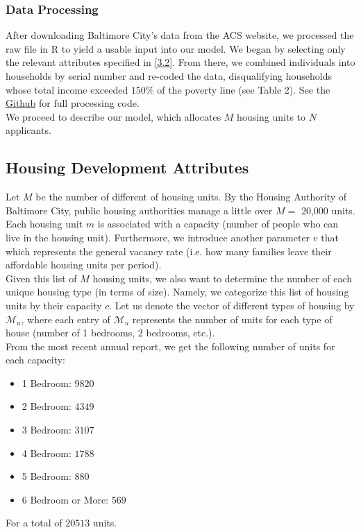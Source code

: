 \documentclass[11pt]{article}
\begin{document}
\subsubsection{Data Processing}
After downloading Baltimore City's data from the ACS website, we processed the raw file in R to yield a usable input into our model. We began by selecting only the relevant attributes specified in \autoref{3.2}. From there, we combined individuals into households by serial number and re-coded the data, disqualifying households whose total income exceeded $150\%$ of the poverty line (see Table 2). See the \href{https://github.com/atulpokh/cpsc464final/tree/main}{Github}  for full processing code. \\
\newline
We proceed to describe our model, which allocates $M$ housing units to $N$ applicants. 
\subsection{Housing Development Attributes}
Let $M$ be the number of different of housing units. By the Housing Authority of Baltimore City, public housing authorities manage a little over $M = $ 20,000 units. Each housing unit $m$ is associated with a capacity (number of people who can live in the housing unit). Furthermore, we introduce another parameter $v$ that which represents the general vacancy rate (i.e. how many families leave their affordable housing units per period). \\
\newline
Given this list of $M$ housing units, we also want to determine the number of each unique housing type (in terms of size). Namely, we categorize this list of housing units by their capacity $c$. Let us denote the vector of different types of housing by $\mathcal{M}_u$, where each entry of $\mathcal{M}_u$ represents the number of units for each type of house (number of 1 bedrooms, 2 bedrooms, etc.). \\
\newline
From the most recent annual report, we get the following number of units for each capacity:
\begin{itemize}
    \item 1 Bedroom: $9820$
    \item 2 Bedroom: $4349$
    \item 3 Bedroom: $3107$
    \item 4 Bedroom: $1788$
    \item 5 Bedroom: $880$
    \item 6 Bedroom or More: $569$ 
\end{itemize}
For a total of $20513$ units.
\end{document}
